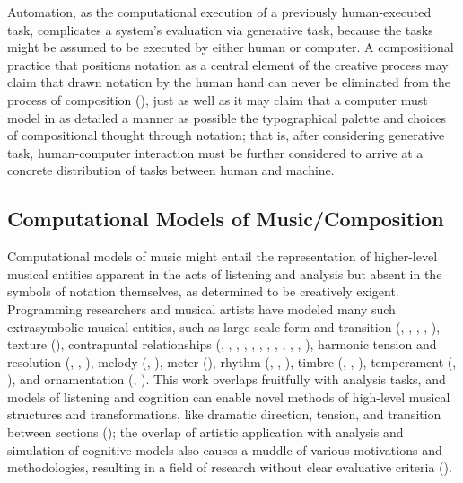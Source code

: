 Automation, as the computational execution of a previously human-executed task, complicates a system's evaluation via generative task, because the tasks might be assumed to be executed by either human or computer. A compositional practice that positions notation as a central element of the creative process may claim that drawn notation by the human hand can never be eliminated from the process of composition (\cite[131]{Hiller:1965}), just as well as it may claim that a computer must model in as detailed a manner as possible the typographical palette and choices of compositional thought through notation; that is, after considering generative task, human-computer interaction must be further considered to arrive at a concrete distribution of tasks between human and machine. 

\subsection{Computational Models of Music/Composition}

Computational models of music might entail the representation of higher-level musical entities apparent in the acts of listening and analysis but absent in the symbols of notation themselves, as determined to be creatively exigent. Programming researchers and musical artists have modeled many such extrasymbolic musical entities, such as large-scale form and transition (\cite{polansky1991morphological}, \cite{uno1994temporal}, \cite{dobrian1995algorithmic}, \cite{abrams1999higher}, \cite{Yoo1983}), texture (\cite{Horenstein:2004kx}), contrapuntal relationships (\cite{Boenn:2009oq}, \cite{Acevedo2005}, \cite{Anders:2011kl}, \cite{Balser:1990tg}, \cite{Jones:2000hc}, \cite{uno1994temporal}, \cite{Bell:1995ij}, \cite{farbood2001analysis}, \cite{Cope:2002fv}, \cite{Laurson:2005dz}, \cite{Polansky:2011fu}, \cite{Ebcioglu:1980kl}), harmonic tension and resolution (\cite{Melo2003}, \cite{Wiggins1999}, \cite{Foster:1995qa}), melody (\cite{Hornel:1993mi}, \cite{Smith:1992pi}), meter (\cite{Hamanaka:2005ff}), rhythm (\cite{Nauert2007}, \cite{Degazio:1996lh}, \cite{Collins:2003bs}), timbre (\cite{Xenakis:1991fu}, \cite{Creasey:1996ye}, \cite{Osaka2004}), temperament (\cite{Seymour:2007qo}, \cite{Graf:2006il}), and ornamentation (\cite{Ariza:2003zt}, \cite{Chico-Topfer:1998jl}). This work overlaps fruitfully with analysis tasks, and models of listening and cognition can enable novel methods of high-level musical structures and transformations, like dramatic direction, tension, and transition between sections (\cite[108]{Collins2009}); the overlap of artistic application with analysis and simulation of cognitive models also causes a muddle of various motivations and methodologies, resulting in a field of research without clear evaluative criteria (\cite{Pearce2002}).

